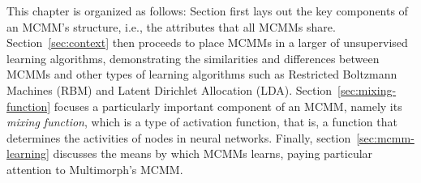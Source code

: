 
This chapter is organized as follows: Section first lays out the key components 
of an MCMM's structure, i.e., the attributes that all MCMMs share. 
Section~\ref{sec:context} then proceeds to place MCMMs in a larger of 
unsupervised learning algorithms, demonstrating 
the similarities and differences between MCMMs and other types of
 learning algorithms such as Restricted Boltzmann Machines (RBM) \citep{smolensky:1986, hinton:2002}
 and Latent Dirichlet Allocation (LDA). Section~\ref{sec:mixing-function} 
 focuses a particularly important component of an MCMM, namely its 
 \emph{mixing function}, which is a type of activation function, that is, a 
 function that determines the activities of nodes in neural networks.  
Finally, section~\ref{sec:mcmm-learning} discusses the means by which 
MCMMs learns, paying particular attention to Multimorph's MCMM.


